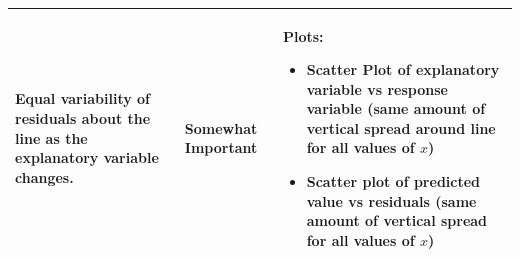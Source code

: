 \documentclass[]{article}
\begin{document}
\begin{table}[htbp]
\begin{tabular}{p{} p{} p{}}
\midrule
\textbf{E}qual variability of residuals about the line as the explanatory variable changes. & Somewhat Important & Plots: \begin{itemize} \item Scatter Plot of explanatory variable vs response variable (same amount of vertical spread around line for all values of $x$) \item Scatter plot of predicted value vs residuals (same amount of vertical spread for all values of $x$) \end{itemize} \\
\bottomrule
\end{tabular}
\label{table:mr}
\end{table}
\end{document}
